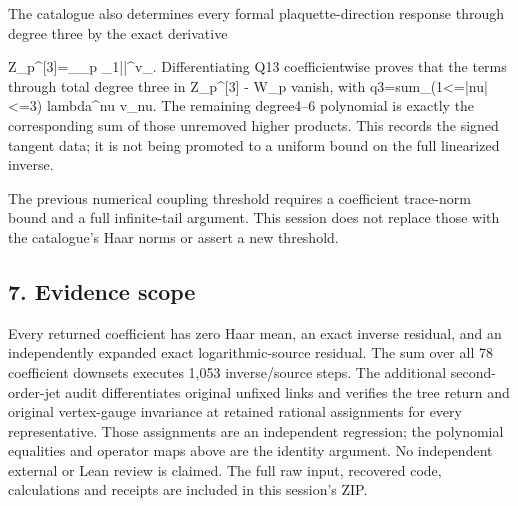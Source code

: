 \documentclass[11pt,a4paper]{article}
\renewcommand{\[}{\begingroup\small\originaldisplaystart}
\renewcommand{\]}{\originaldisplayend\endgroup}
\begin{document}
The catalogue also determines every formal plaquette-direction response
through degree three by the exact derivative

\[
 Z_p^{[3]}=\partial_{\lambda_p}
       \sum_{1\le|\nu|}\lambda^\nu v_\nu.
\] Differentiating Q13 coefficientwise proves that the terms through
total degree three in
{\allowbreak{} \allowbreak{}Z\allowbreak{}\_\allowbreak{}p\allowbreak{}\textasciicircum{}\allowbreak{}[\allowbreak{}3\allowbreak{}]\allowbreak{} \allowbreak{}-\allowbreak{} \allowbreak{}W\allowbreak{}\_\allowbreak{}p\allowbreak{}}
vanish, with
{\ttfamily q\allowbreak{}3\allowbreak{}=\allowbreak{}s\allowbreak{}u\allowbreak{}m\allowbreak{}\_\allowbreak{}(\allowbreak{}1\allowbreak{}\textless{}\allowbreak{}=\allowbreak{}|\allowbreak{}n\allowbreak{}u\allowbreak{}|\allowbreak{}\textless{}\allowbreak{}=\allowbreak{}3\allowbreak{})\allowbreak{} \allowbreak{}l\allowbreak{}a\allowbreak{}m\allowbreak{}b\allowbreak{}d\allowbreak{}a\allowbreak{}\textasciicircum{}\allowbreak{}n\allowbreak{}u\allowbreak{} \allowbreak{}v\allowbreak{}\_\allowbreak{}n\allowbreak{}u\allowbreak{}}.
The remaining degree4--6 polynomial is exactly the corresponding sum of
those unremoved higher products. This records the signed tangent data;
it is not being promoted to a uniform bound on the full linearized
inverse.

The previous numerical coupling threshold requires a coefficient
trace-norm bound and a full infinite-tail argument. This session does
not replace those with the catalogue's Haar norms or assert a new
threshold.

\subsection{7. Evidence scope}\label{evidence-scope}

Every returned coefficient has zero Haar mean, an exact inverse
residual, and an independently expanded exact logarithmic-source
residual. The sum over all 78 coefficient downsets executes 1,053
inverse/source steps. The additional second-order-jet audit
differentiates original unfixed links and verifies the tree return and
original vertex-gauge invariance at retained rational assignments for
every representative. Those assignments are an independent regression;
the polynomial equalities and operator maps above are the identity
argument. No independent external or Lean review is claimed. The full
raw input, recovered code, calculations and receipts are included in
this session's ZIP.
\end{document}
